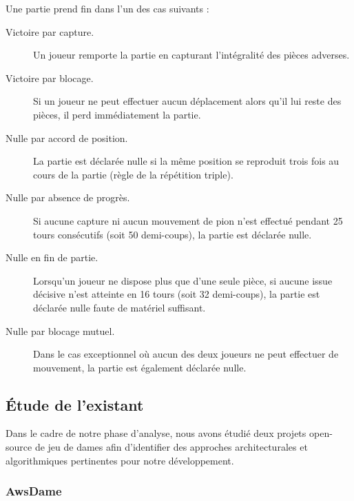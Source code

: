 \documentclass[a4paper]{article}
\begin{document}
Une partie prend fin dans l'un des cas suivants :

\begin{description}
    \item[Victoire par capture.] Un joueur remporte la partie en capturant l'intégralité des
    pièces adverses.

    \item[Victoire par blocage.] Si un joueur ne peut effectuer aucun déplacement alors qu'il
    lui reste des pièces, il perd immédiatement la partie.

    \item[Nulle par accord de position.] La partie est déclarée nulle si la même position se
    reproduit trois fois au cours de la partie (règle de la répétition triple).

    \item[Nulle par absence de progrès.] Si aucune capture ni aucun mouvement de pion n'est
    effectué pendant 25 tours consécutifs (soit 50 demi-coups), la partie est déclarée nulle.

    \item[Nulle en fin de partie.] Lorsqu'un joueur ne dispose plus que d'une seule pièce, si
    aucune issue décisive n'est atteinte en 16 tours (soit 32 demi-coups), la partie est
    déclarée nulle faute de matériel suffisant.

    \item[Nulle par blocage mutuel.] Dans le cas exceptionnel où aucun des deux joueurs ne
    peut effectuer de mouvement, la partie est également déclarée nulle.
\end{description}


\subsection{Étude de l'existant}

Dans le cadre de notre phase d'analyse, nous avons étudié deux projets open-source
de jeu de dames afin d'identifier des approches architecturales et algorithmiques
pertinentes pour notre développement.

\subsubsection*{AwsDame}
\end{document}
